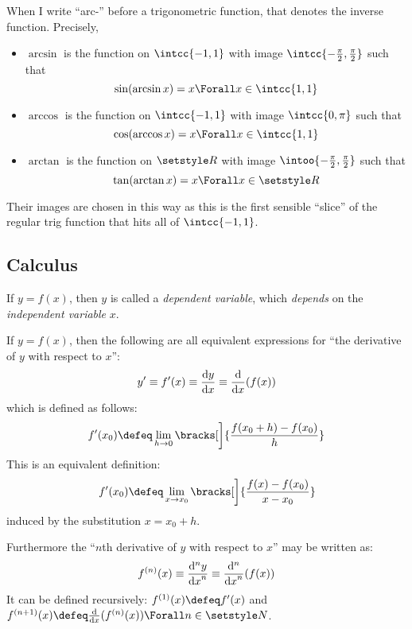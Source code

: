 When I write ``arc-'' before a trigonometric function, that denotes the inverse
function. Precisely,
\begin{itemize}
 \item
  \(\arcsin\) is the function on \(\intcc{-1, 1}\) with image
  \(\intcc{-\frac \pi 2, \frac \pi 2}\) such that
  \begin{equation*}
   \sin(\arcsin x) = x \Forall x \in \intcc{1, 1}
  \end{equation*}
 \item
  \(\arccos\) is the function on \(\intcc{-1, 1}\) with image
  \(\intcc{0, \pi}\) such that
  \begin{equation*}
   \cos(\arccos x) = x \Forall x \in \intcc{1, 1}
  \end{equation*}
 \item
  \(\arctan\) is the function on \(\Reals\) with image
  \(\intoo{-\frac \pi 2, \frac \pi 2}\) such that
  \begin{equation*}
   \tan(\arctan x) = x \Forall x \in \Reals
  \end{equation*}
\end{itemize}
Their images are chosen in this way as this is the first sensible ``slice'' of
the regular trig function that hits all of \(\intcc{-1, 1}\).

\subsection{Calculus}

If \(y = f(x)\), then \(y\) is called a \emph{dependent variable}, which
\emph{depends} on the \emph{independent variable} \(x\).

If \(y = f(x)\), then the following are all equivalent expressions for ``the
derivative of \(y\) with respect to \(x\)'':
\begin{equation*}
 y'
 \equiv f'(x)
 \equiv \dv<y>{x}
 \equiv \dv{x}(f(x))
\end{equation*}
which is defined as follows:
\begin{equation*}
 f'(x_0) \defeq
  \lim_{h \to 0}
   \bracks[\bigg]{
    \frac{f(x_0 + h) - f(x_0)} h
   }
\end{equation*}
This is an equivalent definition:
\begin{equation*}
 f'(x_0) \defeq
  \lim_{x \to x_0}
  \bracks[\bigg]{
   \frac{f(x) - f(x_0)}{x - x_0}
  }
\end{equation*}
induced by the substitution \(x = x_0 + h\).

Furthermore the ``\(n\)th derivative of \(y\) with respect to \(x\)'' may be
written as:
\begin{equation*}
 f^{(n)}(x)
 \equiv \dv[n]<y>{x}
 \equiv \dv[n]{x}(f(x))
\end{equation*}
It can be defined recursively: \(f^{(1)}(x) \defeq f'(x)\) and
\(f^{(n + 1)}(x) \defeq \dv{x}(f^{(n)}(x)) \Forall n \in \Naturals\).

